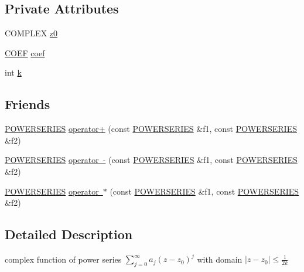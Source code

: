 \subsection*{Private Attributes}
\begin{DoxyCompactItemize}
\item 
C\+O\+M\+P\+L\+EX \mbox{\hyperlink{classi_r_r_a_m_1_1_p_o_w_e_r_s_e_r_i_e_s_a9ce9c509d0376f35f6c6b5d876d6683f}{z0}}
\item 
\mbox{\hyperlink{namespacei_r_r_a_m_a7fb438d61c85aface41ae108812df36f}{C\+O\+EF}} \mbox{\hyperlink{classi_r_r_a_m_1_1_p_o_w_e_r_s_e_r_i_e_s_a4a9d45aaad4a616c78c2cb9cf83942bc}{coef}}
\item 
int \mbox{\hyperlink{classi_r_r_a_m_1_1_p_o_w_e_r_s_e_r_i_e_s_aefb307111078169532e8a0b16507469a}{k}}
\end{DoxyCompactItemize}
\subsection*{Friends}
\begin{DoxyCompactItemize}
\item 
\mbox{\hyperlink{classi_r_r_a_m_1_1_p_o_w_e_r_s_e_r_i_e_s}{P\+O\+W\+E\+R\+S\+E\+R\+I\+ES}} \mbox{\hyperlink{classi_r_r_a_m_1_1_p_o_w_e_r_s_e_r_i_e_s_a3b6840781be086f4d790bc7fb56d15cd}{operator+}} (const \mbox{\hyperlink{classi_r_r_a_m_1_1_p_o_w_e_r_s_e_r_i_e_s}{P\+O\+W\+E\+R\+S\+E\+R\+I\+ES}} \&f1, const \mbox{\hyperlink{classi_r_r_a_m_1_1_p_o_w_e_r_s_e_r_i_e_s}{P\+O\+W\+E\+R\+S\+E\+R\+I\+ES}} \&f2)
\item 
\mbox{\hyperlink{classi_r_r_a_m_1_1_p_o_w_e_r_s_e_r_i_e_s}{P\+O\+W\+E\+R\+S\+E\+R\+I\+ES}} \mbox{\hyperlink{classi_r_r_a_m_1_1_p_o_w_e_r_s_e_r_i_e_s_a86404e3d5b9a0aabad7a6c3846360f42}{operator -\/}} (const \mbox{\hyperlink{classi_r_r_a_m_1_1_p_o_w_e_r_s_e_r_i_e_s}{P\+O\+W\+E\+R\+S\+E\+R\+I\+ES}} \&f1, const \mbox{\hyperlink{classi_r_r_a_m_1_1_p_o_w_e_r_s_e_r_i_e_s}{P\+O\+W\+E\+R\+S\+E\+R\+I\+ES}} \&f2)
\item 
\mbox{\hyperlink{classi_r_r_a_m_1_1_p_o_w_e_r_s_e_r_i_e_s}{P\+O\+W\+E\+R\+S\+E\+R\+I\+ES}} \mbox{\hyperlink{classi_r_r_a_m_1_1_p_o_w_e_r_s_e_r_i_e_s_afc89ab0bc111fde98121793ebff11f5f}{operator $\ast$}} (const \mbox{\hyperlink{classi_r_r_a_m_1_1_p_o_w_e_r_s_e_r_i_e_s}{P\+O\+W\+E\+R\+S\+E\+R\+I\+ES}} \&f1, const \mbox{\hyperlink{classi_r_r_a_m_1_1_p_o_w_e_r_s_e_r_i_e_s}{P\+O\+W\+E\+R\+S\+E\+R\+I\+ES}} \&f2)
\end{DoxyCompactItemize}


\subsection{Detailed Description}
complex function of power series $ \displaystyle\sum_{j=0}^{\infty}{a_j (z - z_0)^j} $ with domain $ |z - z_0| \leq \frac{1}{2k}$ 

